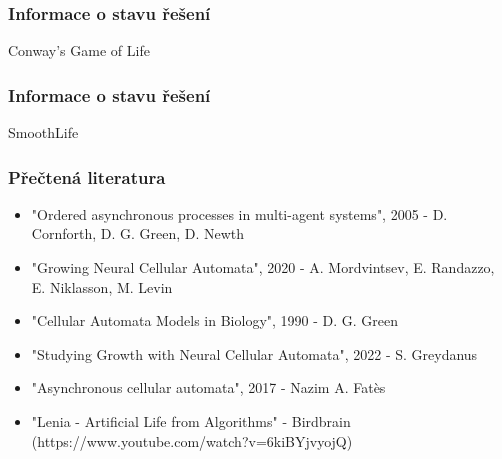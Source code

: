 \documentclass[10pt]{beamer}
\begin{document}
\begin{frame}
	\frametitle{Informace o stavu řešení}
	\centering
	\parbox{\textwidth}{
		\centering
		Conway's Game of Life
		\vspace{0.2cm}
	}
	\parbox{0.6\textwidth}{
	}
\end{frame}

\begin{frame}
	\frametitle{Informace o stavu řešení}
	\centering
	\parbox{\textwidth}{
		\centering
		SmoothLife
		\vspace{0.2cm}
	}
	\parbox{0.6\textwidth}{
	}
\end{frame}

\begin{frame}
	\frametitle{Přečtená literatura}
	\begin{itemize}
		\item "Ordered asynchronous processes in multi-agent systems", 2005 - D. Cornforth, D. G. Green, D. Newth
		\item "Growing Neural Cellular Automata", 2020 - A. Mordvintsev, E. Randazzo, E. Niklasson, M. Levin
		\item "Cellular Automata Models in Biology", 1990 - D. G. Green
		\item "Studying Growth with Neural Cellular Automata", 2022 - S. Greydanus
		\item "Asynchronous cellular automata", 2017 - Nazim A. Fatès
		\item "Lenia - Artificial Life from Algorithms" - Birdbrain (https://www.youtube.com/watch?v=6kiBYjvyojQ)
	\end{itemize}
\end{frame}

\end{document}
